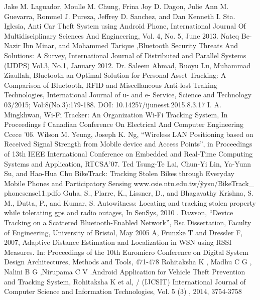 \documentclass[a4paper,10pt]{report}
\begin{document}
\begin{thebibliography}{9}
 Jake M. Laguador, Moulle M. Chung, Frina Joy D. Dagon, Julie Ann M. Guevarra, Rommel J. Pureza, Jeffrey D. Sanchez, and Dan Kenneth I. Sta. Iglesia, Anti Car Theft System using Android Phone, International Journal Of Multidisciplinary Sciences And Engineering, Vol. 4, No. 5, June 2013.
 Nateq Be-Nazir Ibn Minar, and Mohammed Tarique ,Bluetooth Security Threats And Solutions: A Survey, International Journal of Distributed and Parallel Systems (IJDPS) Vol.3, No.1, January 2012.
 Dr. Saleem Ahmad, Ruoyu Lu, Muhammad Ziaullah, Bluetooth an Optimal Solution for Personal Asset Tracking: A Comparison of Bluetooth, RFID and Miscellaneous Anti-lost Traking Technologies, International Journal of u- and e- Service, Science and Technology 03/2015; Vol:8(No.3):179-188. DOI: 10.14257/ijunesst.2015.8.3.17
 I. A. Mingkhwan, Wi-Fi Tracker: An Organization Wi-Fi Tracking System, In Proceedings f Canadian Conference On Electrical And Computer Engineering Ccece '06.
 Wilson M. Yeung, Joseph K. Ng, “Wireless LAN Positioning based on Received Signal Strength from Mobile device and Access Points”, in Proceedings of 13th IEEE International Conference on Embedded and Real-Time Computing Systems and Application, RTCSA’07.
 Ted Tsung-Te Lai, Chun-Yi Lin, Ya-Yunn Su, and Hao-Hua Chu  BikeTrack: Tracking Stolen Bikes through Everyday Mobile Phones and Participatory Sensing www.csie.ntu.edu.tw/\~yysu/BikeTrack\_ phonesense11.pdfo
  Guha, S., Plarre, K., Lissner, D., and Bhagavathy Krishna, S. M., Dutta, P., and Kumar, S. Autowitness: Locating and tracking stolen property while tolerating gps and radio outages, In SenSys, 2010
 . Dawson, “Device Tracking on a Scattered Bluetooth-Enabled Network”, Bsc Dissertation, Faculty of Engineering, University of Bristol, May 2005
  A, Frunzke T and Dressler F, 2007, Adaptive Distance Estimation and Localization in WSN using RSSI Measures. In: Proceedings of the 10th Euromicro Conference on Digital System Design Architectures, Methods and Tools, 471-478
 Rohitaksha K , Madhu C G , Nalini B G ,Nirupama C V .Android Application for Vehicle Theft Prevention and Tracking System, Rohitaksha K et al, / (IJCSIT) International Journal of Computer Science and Information Technologies, Vol. 5 (3) , 2014, 3754-3758
\end{thebibliography}
\end{document}
